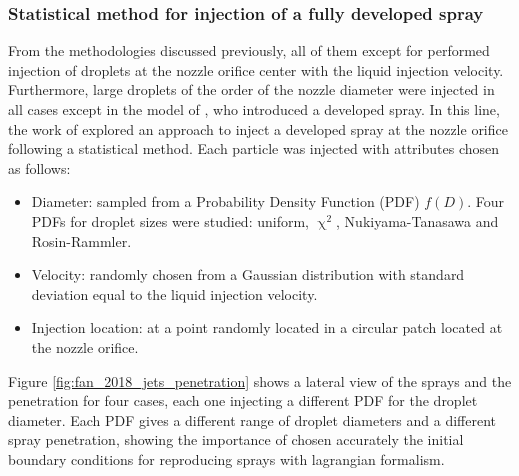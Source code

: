 \subsubsection*{Statistical method for injection of a fully developed spray }

From the methodologies discussed previously, all of them except for  performed injection of droplets at the nozzle orifice center with the liquid injection velocity. Furthermore, large droplets of the order of the nozzle diameter were injected in all cases except in the model of , who introduced a developed spray. In this line, the work of  explored an approach to inject a developed spray at the nozzle orifice following a statistical method. Each particle was injected with attributes chosen as follows:

\begin{itemize}
	
	\item Diameter: sampled from a Probability Density Function (PDF) $f \left(  D \right)$. Four PDFs for droplet sizes were studied: uniform, $\upchi^2$, Nukiyama-Tanasawa and Rosin-Rammler.

	\item Velocity: randomly chosen from a Gaussian distribution with standard deviation equal to the liquid injection velocity.
	
	\item Injection location: at a point randomly located in a circular patch located at the nozzle orifice.

\end{itemize}

Figure \ref{fig:fan_2018_jets_penetration} shows a lateral view of the sprays and the penetration for four cases, each one injecting a different PDF for the droplet diameter. Each PDF gives a different range of droplet diameters and a different spray penetration, showing the importance of chosen accurately the initial boundary conditions for reproducing sprays with lagrangian formalism.

